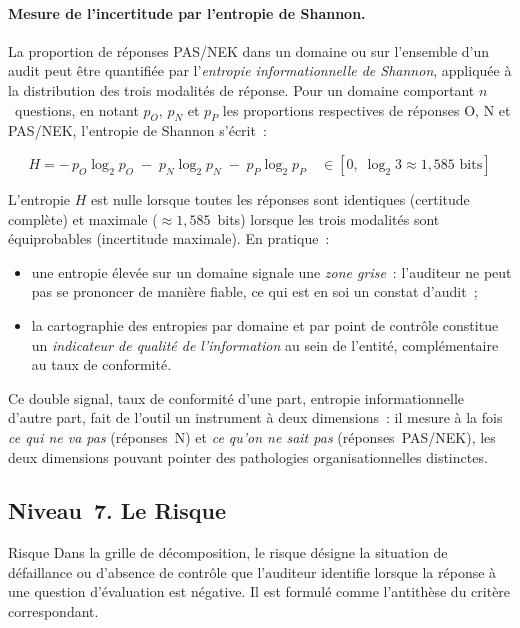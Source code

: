 \paragraph{Mesure de l'incertitude par l'entropie de Shannon.}
La proportion de réponses PAS/NEK dans un domaine ou sur l'ensemble d'un audit
peut être quantifiée par l'\emph{entropie informationnelle de Shannon},
appliquée à la distribution des trois modalités de réponse. Pour un domaine
comportant $n$~questions, en notant $p_O$, $p_N$ et $p_P$ les proportions
respectives de réponses O, N et PAS/NEK, l'entropie de Shannon s'écrit~:

\begin{equation}
H = -\, p_O \log_2 p_O \;-\; p_N \log_2 p_N \;-\; p_P \log_2 p_P
\quad \in [0,\; \log_2 3 \approx 1{,}585 \text{ bits}]
\end{equation}

L'entropie $H$ est nulle lorsque toutes les réponses sont identiques (certitude
complète) et maximale ($\approx 1{,}585$~bits) lorsque les trois modalités sont
équiprobables (incertitude maximale). En pratique~:

\begin{itemize}
  \item une entropie élevée sur un domaine signale une \emph{zone grise}~:
        l'auditeur ne peut pas se prononcer de manière fiable, ce qui est en
        soi un constat d'audit~;
  \item la cartographie des entropies par domaine et par point de contrôle
        constitue un \emph{indicateur de qualité de l'information} au sein de
        l'entité, complémentaire au taux de conformité.
\end{itemize}

Ce double signal, taux de conformité d'une part, entropie informationnelle
d'autre part, fait de l'outil un instrument à deux dimensions~: il mesure à
la fois \emph{ce qui ne va pas} (réponses~N) et \emph{ce qu'on ne sait pas}
(réponses~PAS/NEK), les deux dimensions pouvant pointer des pathologies
organisationnelles distinctes.

\subsection{Niveau~7. Le Risque}

\begin{boxdef}{Risque}
Dans la grille de décomposition, le risque désigne la situation de défaillance
ou d'absence de contrôle que l'auditeur identifie lorsque la réponse à une
question d'évaluation est négative. Il est formulé comme l'antithèse du critère
correspondant.
\end{boxdef}

